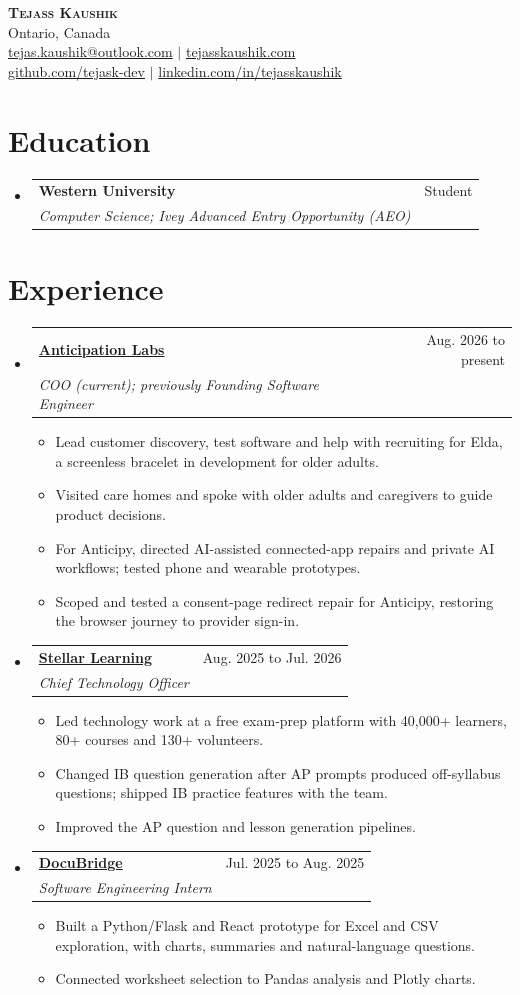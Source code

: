 \documentclass[letterpaper,11pt]{article}
\makeatletter
\newcommand{\resumeItem}[1]{
  \item\small{
    {#1 \vspace{-2pt}}
  }
}
\newcommand{\resumeSubheading}[4]{
  \vspace{-2pt}\item
    \begin{tabular*}{0.97\textwidth}[t]{l@{\extracolsep{\fill}}r}
      \textbf{#1} & #2 \\
      \textit{\small#3} & \textit{\small #4} \\
    \end{tabular*}\vspace{-7pt}
}
\newcommand{\resumeSubHeadingListStart}{\begin{itemize}[leftmargin=0.15in, label={}]}
\newcommand{\resumeSubHeadingListEnd}{\end{itemize}}
\newcommand{\resumeItemListStart}{\begin{itemize}}
\newcommand{\resumeItemListEnd}{\end{itemize}\vspace{-5pt}}
\makeatother
\begin{document}
\begin{center}
\textbf{\Huge \scshape Tejass Kaushik} \\ \vspace{2pt}
\small Ontario, Canada \\ \vspace{2pt}
\href{mailto:tejas.kaushik@outlook.com}{tejas.kaushik@outlook.com} $|$ \href{https://tejasskaushik.com/}{tejasskaushik.com} \\ \vspace{2pt}
\href{https://github.com/tejask-dev}{github.com/tejask-dev} $|$ \href{https://www.linkedin.com/in/tejasskaushik/}{linkedin.com/in/tejasskaushik}
\end{center}
\section{Education}
\resumeSubHeadingListStart
\resumeSubheading{Western University}{Student}{Computer Science; Ivey Advanced Entry Opportunity (AEO)}{}

\resumeSubHeadingListEnd
\section{Experience}
\resumeSubHeadingListStart
\resumeSubheading{\href{https://www.anticipationlabs.com/}{Anticipation Labs}}{Aug. 2026 to present}{COO (current); previously Founding Software Engineer}{}
\resumeItemListStart
\resumeItem{Lead customer discovery, test software and help with recruiting for Elda, a screenless bracelet in development for older adults.}
\resumeItem{Visited care homes and spoke with older adults and caregivers to guide product decisions.}
\resumeItem{For Anticipy, directed AI-assisted connected-app repairs and private AI workflows; tested phone and wearable prototypes.}
\resumeItem{Scoped and tested a consent-page redirect repair for Anticipy, restoring the browser journey to provider sign-in.}
\resumeItemListEnd
\resumeSubheading{\href{https://stellarlearning.app/}{Stellar Learning}}{Aug. 2025 to Jul. 2026}{Chief Technology Officer}{}
\resumeItemListStart
\resumeItem{Led technology work at a free exam-prep platform with 40,000+ learners, 80+ courses and 130+ volunteers.}
\resumeItem{Changed IB question generation after AP prompts produced off-syllabus questions; shipped IB practice features with the team.}
\resumeItem{Improved the AP question and lesson generation pipelines.}
\resumeItemListEnd
\resumeSubheading{\href{https://github.com/tejask-dev/Docubridge-Intership}{DocuBridge}}{Jul. 2025 to Aug. 2025}{Software Engineering Intern}{}
\resumeItemListStart
\resumeItem{Built a Python/Flask and React prototype for Excel and CSV exploration, with charts, summaries and natural-language questions.}
\resumeItem{Connected worksheet selection to Pandas analysis and Plotly charts.}
\resumeItemListEnd
\resumeSubHeadingListEnd
\end{document}
